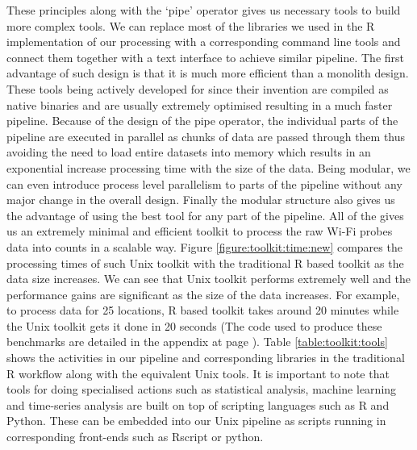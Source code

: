These principles along with the `pipe' operator gives us necessary tools to build more complex tools.
We can replace most of the libraries we used in the R implementation of our processing with a corresponding command line tools and connect them together with a text interface to achieve similar pipeline.
The first advantage of such design is that it is much more efficient than a monolith design.
These tools being actively developed for since their invention are compiled as native binaries and are usually extremely optimised resulting in a much faster pipeline.
Because of the design of the pipe operator, the individual parts of the pipeline are executed in parallel as chunks of data are passed through them thus avoiding the need to load entire datasets into memory which results in an exponential increase processing time with the size of the data.
Being modular, we can even introduce process level parallelism to parts of the pipeline without any major change in the overall design.
Finally the modular structure also gives us the advantage of using the best tool for any part of the pipeline.
All of the gives us an extremely minimal and efficient toolkit to process the raw Wi-Fi probes data into counts in a scalable way.
Figure \ref{figure:toolkit:time:new} compares the processing times of such Unix toolkit with the traditional R based toolkit as the data size increases.
We can see that Unix toolkit performs extremely well and the performance gains are significant as the size of the data increases.
For example, to process data for 25 locations, R based toolkit takes around 20 minutes while the Unix toolkit gets it done in 20 seconds 
(The code used to produce these benchmarks are detailed in the appendix at page \pageref{appendix:benchmark}).
Table \ref{table:toolkit:tools} shows the activities in our pipeline and corresponding libraries in the traditional R workflow along with the equivalent Unix tools.
It is important to note that tools for doing specialised actions such as statistical analysis, machine learning and time-series analysis are built on top of scripting languages such as R and Python.
These can be embedded into our Unix pipeline as scripts running in corresponding front-ends such as Rscript or python.

